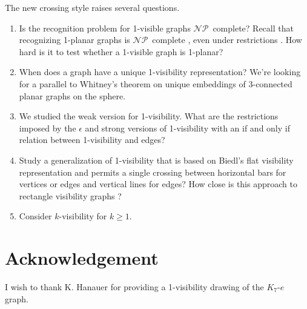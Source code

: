 \documentclass[runningheads]{llncs}
\newcommand{\NP}{\ensuremath{\mathcal{NP}}}
\begin{document}
The new crossing style raises several questions.
\begin{enumerate}
  \item Is the recognition problem for 1-visible graphs \NP \, complete?
  Recall that recognizing 1-planar graphs is \NP \, complete
  \cite{km-mo1ih-13}, even under restrictions
  \cite{abgr-o1pgr-12,km-mo1ih-13}. How hard is it to test
  whether a 1-visible graph is 1-planar?
  \item When does a graph have a unique 1-visibility representation?
  We're looking for a parallel to Whitney's theorem on unique
  embeddings of 3-connected planar graphs on the sphere.
  \item We studied the weak version for 1-visibility. What are the
  restrictions imposed by the $\epsilon$ and strong versions of
  1-visibility with an if and only if relation between
  1-visibility and edges?
  \item Study a generalization of 1-visibility that is based on Biedl's flat visibility
  representation and permits a single  crossing between
  horizontal bars for vertices or edges and vertical lines for
  edges? How close is this approach to rectangle visibility
  graphs \cite{dh-rvrbg-94,hsv-orstt-95,hsv-rstg-99}?
  \item Consider $k$-visibility for $k \geq 1$.
\end{enumerate}



\section{Acknowledgement}
I wish to thank K. Hanauer for providing a 1-visibility drawing of
the  $K_7$-$e$ graph.
\end{document}
